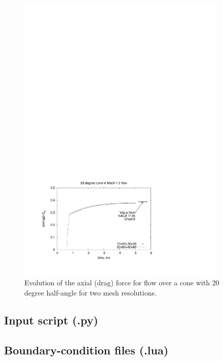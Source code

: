 \begin{figure}[htbp]
\begin{center}
\includegraphics[width=10cm, viewport=52 49 401 294]{../2D/cone20-udf/cone20_cp.pdf}
\end{center}
\caption{Evolution of the axial (drag) force
         for flow over a cone with 20 degree half-angle
	 for two mesh resolutions.}
\label{cone20-udf-axial-force-fig}
\end{figure}

\newpage

\subsection{Input script (.py)}
\topbar

\bottombar

\newpage
\subsection{Boundary-condition files (.lua)}
\topbar

\bottombar \\
\topbar

\bottombar \\
\topbar

\bottombar \\
\topbar

\bottombar

